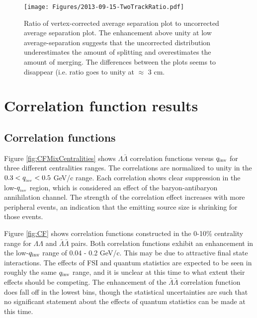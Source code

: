 \begin{figure}[hbtp]
\texttt{[image: Figures/2013-09-15-TwoTrackRatio.pdf]}
\caption[Ratio of corrected/uncorrected average-separation distributions]{Ratio of vertex-corrected average separation plot to uncorrected average separation plot.  The enhancement above unity at low average-separation suggests that the uncorrected distribution underestimates the amount of splitting and overestimates the amount of merging.  The differences between the plots seems to disappear (i.e. ratio goes to unity at $\approx$ 3 cm.}
\label{fig:TwoTrackRatio}
\end{figure}

\section{Correlation function results}
\subsection{Correlation functions}
\label{sec:RawCorrelationFunctions}



Figure \ref{fig:CFMixCentralities} shows $\Lambda\bar{\Lambda}$ correlation functions versus $q_{\rm inv}$ for three different centralities ranges.  The correlations are normalized to unity in the $ 0.3 < q_{\rm_{inv}} < 0.5$ GeV/c range.  Each correlation shows clear suppression in the low-$q_{\rm_{inv}}$ region, which is considered an effect of the baryon-antibaryon annihilation channel.  The strength of the correlation effect increases with more peripheral events, an indication that the emitting source size is shrinking for those events.

Figure \ref{fig:CF} shows correlation functions constructed in the 0-10\% centrality range for $\Lambda\Lambda$ and $\bar{\Lambda}\bar{\Lambda}$ pairs.  Both correlation functions exhibit an enhancement in the low-$q_{\rm inv}$ range of 0.04 - 0.2 GeV/c.  This may be due to attractive final state interactions.  The effects of FSI and quantum statistics are expected to be seen in roughly the same $q_{\rm inv}$ range, and it is unclear at this time to what extent their effects should be competing. The enhancement of the $\bar{\Lambda}\bar{\Lambda}$ correlation function does fall off in the lowest bins, though the statistical uncertainties are such that no significant statement about the effects of quantum statistics can be made at this time.



